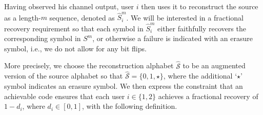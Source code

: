 %
%
%
%


Having observed his channel output, user $i$ then uses it to reconstruct the source as a length-$m$ sequence, denoted as $\hat{S}_{i}^{m}$.  We will be interested in a fractional recovery requirement so that each symbol in $\hat{S}_{i}^{m}$ either faithfully recovers the corresponding symbol in $S^{m}$, or otherwise a failure is indicated with an erasure symbol, i.e., we do not allow for any bit flips.

More precisely, we choose the reconstruction alphabet $\mathcal{\hat{S}}$ to be an augmented version of the source alphabet so that $\mathcal{\hat{S}} = \{0, 1, \star\}$, where the additional `$\star$' symbol indicates an erasure symbol.  We then express the constraint that an achievable code ensures that each user $i \in \{1, 2\}$ achieves a fractional recovery of $1 - d_{i}$, where $d_{i}  \in [0, 1]$, with the following definition.




